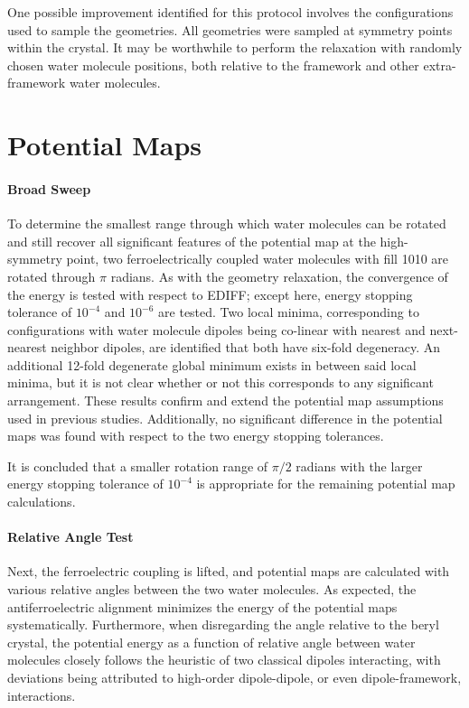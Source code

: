One possible improvement identified for this protocol involves the configurations used to sample the geometries. All geometries were sampled at symmetry points within the crystal. It may be worthwhile to perform the relaxation with randomly chosen water molecule positions, both relative to the framework and other extra-framework water molecules.

\section{Potential Maps}

\paragraph{Broad Sweep} To determine the smallest range through which water molecules can be rotated and still recover all significant features of the potential map at the high-symmetry point, two ferroelectrically coupled water molecules with fill 1010 are rotated through $\pi$ radians. As with the geometry relaxation, the convergence of the energy is tested with respect to EDIFF; except here, energy stopping tolerance of $10^{-4}$ and $10^{-6}$ are tested. Two local minima, corresponding to configurations with water molecule dipoles being co-linear with nearest and next-nearest neighbor dipoles, are identified that both have six-fold degeneracy. An additional 12-fold degenerate global minimum exists in between said local minima, but it is not clear whether or not this corresponds to any significant arrangement. These results confirm and extend the potential map assumptions used in previous studies. Additionally, no significant difference in the potential maps was found with respect to the two energy stopping tolerances.

It is concluded that a smaller rotation range of $\pi/2$ radians with the larger energy stopping tolerance of $10^{-4}$ is appropriate for the remaining potential map calculations.

\paragraph{Relative Angle Test} Next, the ferroelectric coupling is lifted, and potential maps are calculated with various relative angles between the two water molecules. As expected, the antiferroelectric alignment minimizes the energy of the potential maps systematically. Furthermore, when disregarding the angle relative to the beryl crystal, the potential energy as a function of relative angle between water molecules closely follows the heuristic of two classical dipoles interacting, with deviations being attributed to high-order dipole-dipole, or even dipole-framework, interactions. 

